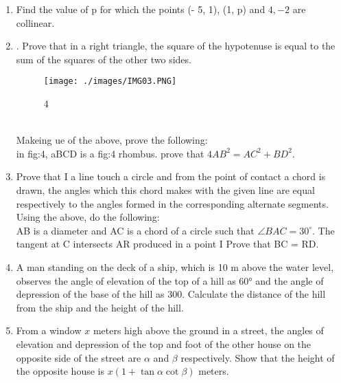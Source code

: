 \documentclass{article}                                                                                   \usepackage{amsmath, amssymb}
\begin{document}
\begin{enumerate}
\item Find the value of p for which the points (- 5, 1), (1, p) and \(4, - 2\) are collinear.
\item . Prove that in a right triangle, the square of the hypotenuse is equal to the sum of the
squares of the other two sides.
\begin{figure}[h]
        \centering
          \texttt{[image: ./images/IMG03.PNG]}
          \caption{4}
          \label{fig:}

 \end{figure}\\
Makeing  ue  of the above, prove the following:\\
in fig:4, aBCD is a fig:4 rhombus. prove that $4AB^2 =  AC^2 +BD^2$.


\item Prove that I a line touch a circle and from the point of contact a chord is drawn, the angles
which this chord makes with the given line are equal respectively to the angles formed in the
corresponding alternate segments.
Using the above, do the following: \\
AB is a diameter and AC is a chord of a circle such that $\angle BAC=30^\circ$. The tangent at C
intersects AR produced in a point I Prove that BC = RD.

\item A man standing on the deck of a ship, which is 10 m above the water level, observes the
angle of elevation of the top of a hill as 60° and the angle of depression of the base of the hill as
300. Calculate the distance of the hill from the ship and the height of the hill.

\item From a window $x$ meters high above the ground in a street, the angles of elevation and depression of the top and foot of the other house on the opposite side of the street are $\alpha$ and $\beta$ respectively. Show that the height of the opposite house is $x(1 + \tan \alpha \cot \beta)$ meters.






\end{enumerate}
\end{document}
